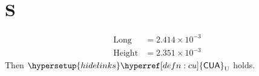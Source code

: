 \documentclass{article}
\newcommand\CUA{\hypersetup{hidelinks}\hyperref[defn:cu]{\mathsf{CUA}}}
\begin{document}
\section{S}\label{defn:cu}
\[
\begin{aligned}
\text{Long}   &= 2.414 \times 10^{-3} \\
\text{Height} &= 2.351 \times 10^{-3}
\end{aligned}
\]
Then \(\CUA_\mathrm{U}\) holds.
\end{document}
